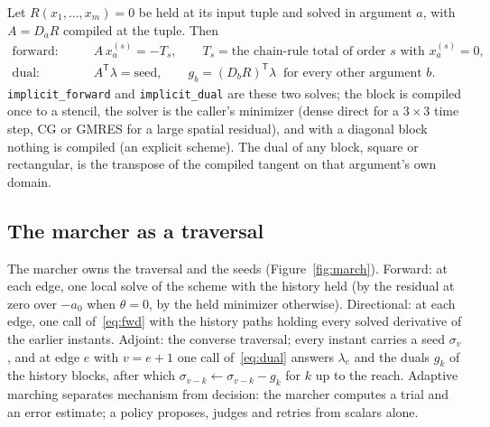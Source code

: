 \documentclass[11pt,a4paper]{article}
\newcommand{\tr}{^{\mathsf T}}
\newcommand{\code}[1]{\texttt{#1}}
\begin{document}
Let $R(x_1,\dots,x_m)=0$ be held at its input tuple and solved in argument $a$, with $A=D_aR$ compiled at the tuple. Then
\begin{align}
\text{forward:}&\qquad A\,x_a^{(s)} = -T_s,\qquad T_s = \text{the chain-rule total of order $s$ with } x_a^{(s)}=0, \label{eq:fwd}\\
\text{dual:}&\qquad A\tr\lambda = \text{seed},\qquad g_b = (D_bR)\tr\lambda \ \text{ for every other argument } b. \label{eq:dual}
\end{align}
\code{implicit\_forward} and \code{implicit\_dual} are these two solves; the block is compiled once to a stencil, the solver is the caller's minimizer (dense direct for a $3\times3$ time step, CG or GMRES for a large spatial residual), and with a diagonal block nothing is compiled (an explicit scheme). The dual of any block, square or rectangular, is the transpose of the compiled tangent on that argument's own domain.

\subsection{The marcher as a traversal}\label{sec:marcher}

The marcher owns the traversal and the seeds (Figure~\ref{fig:march}). Forward: at each edge, one local solve of the scheme with the history held (by the residual at zero over $-a_0$ when $\theta=0$, by the held minimizer otherwise). Directional: at each edge, one call of~\eqref{eq:fwd} with the history paths holding every solved derivative of the earlier instants. Adjoint: the converse traversal; every instant carries a seed $\sigma_v$, and at edge $e$ with $v=e+1$ one call of~\eqref{eq:dual} answers $\lambda_e$ and the duals $g_k$ of the history blocks, after which $\sigma_{v-k}\leftarrow\sigma_{v-k}-g_k$ for $k$ up to the reach. Adaptive marching separates mechanism from decision: the marcher computes a trial and an error estimate; a policy proposes, judges and retries from scalars alone.
\end{document}
